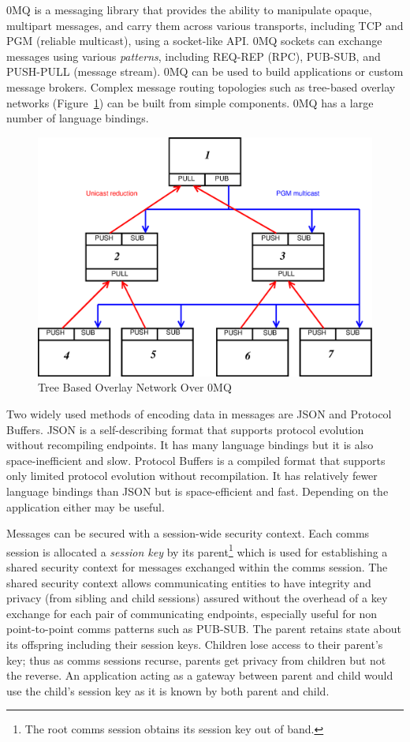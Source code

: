 0MQ\cite{ZMQGuide} is a messaging library that
provides the ability to manipulate opaque, multipart messages, and
carry them across various transports, including TCP and PGM\cite{rfc3208}
(reliable multicast), using a socket-like API.  0MQ sockets can
exchange messages using various {\em patterns},
including REQ-REP (RPC), PUB-SUB, and PUSH-PULL (message stream).
0MQ can be used to build applications or custom message brokers.
Complex message routing topologies such as tree-based overlay networks
(Figure~\ref{FigZmqTBON}) can be built from simple components.
0MQ has a large number of language bindings.

\begin{figure}
\centering
\includegraphics[scale=0.35]{../fig/zmqtbon.eps}
\caption{Tree Based Overlay Network Over 0MQ}
\label{FigZmqTBON}
\end{figure}

Two widely used methods of encoding data in messages are
JSON\cite{rfc4627} 
and Protocol Buffers\cite{Protobuf}.
JSON is a self-describing format
that supports protocol evolution without recompiling endpoints.  It has
many language bindings but it is also space-inefficient and slow.
Protocol Buffers is a compiled format that supports
only limited protocol evolution without recompilation.  It has relatively
fewer language bindings than JSON but is space-efficient and fast.
Depending on the application either may be useful.

Messages can be secured with a session-wide security context.
Each comms session is allocated a {\em session key} by its parent\footnote{
The root comms session obtains its session key out of band.}
which is used for establishing a shared security context
for messages exchanged within the comms session.
The shared security context allows communicating entities to have integrity
and privacy (from sibling and child sessions) assured without the overhead
of a key exchange for each pair of communicating endpoints,
especially useful for non point-to-point comms patterns such as PUB-SUB.
The parent retains state about its offspring including their session keys.
Children lose access to their parent's key;  thus as comms sessions recurse,
parents get privacy from children but not the reverse.
An application acting as a gateway between parent and child would use
the child's session key as it is known by both parent and child.


